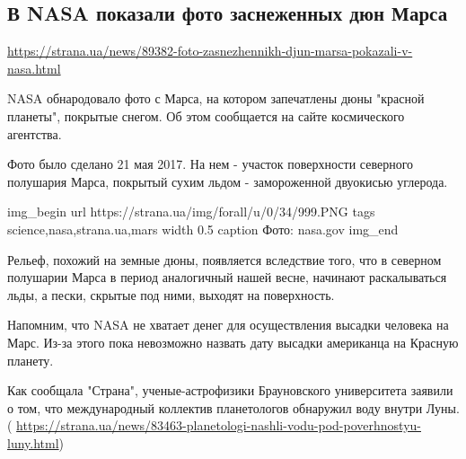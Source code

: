  
 

\subsection{В NASA показали фото заснеженных дюн Марса}
\label{sec:28_08_2017.news.ua.strana.1_nasa_mars_dunes}

\url{https://strana.ua/news/89382-foto-zasnezhennikh-djun-marsa-pokazali-v-nasa.html}

NASA обнародовало фото с Марса, на котором запечатлены дюны "красной планеты",
покрытые снегом. Об этом сообщается на сайте космического агентства.

Фото было сделано 21 мая 2017. На нем - участок поверхности северного полушария
Марса, покрытый сухим льдом - замороженной двуокисью углерода.

\ifcmt
  img_begin 
    url https://strana.ua/img/forall/u/0/34/999.PNG
    tags science,nasa,strana.ua,mars
    width 0.5
    caption Фото: nasa.gov
  img_end
\fi

Рельеф, похожий на земные дюны, появляется вследствие того, что в северном
полушарии Марса в период аналогичный нашей весне, начинают раскалываться льды,
а пески, скрытые под ними, выходят на поверхность.

Напомним, что NASA не хватает денег для осуществления высадки человека на Марс.
Из-за этого пока невозможно назвать дату высадки американца на Красную планету.

Как сообщала "Страна", ученые-астрофизики Брауновского университета заявили о
том, что международный коллектив планетологов обнаружил воду внутри Луны.  (
\url{https://strana.ua/news/83463-planetologi-nashli-vodu-pod-poverhnostyu-luny.html})
